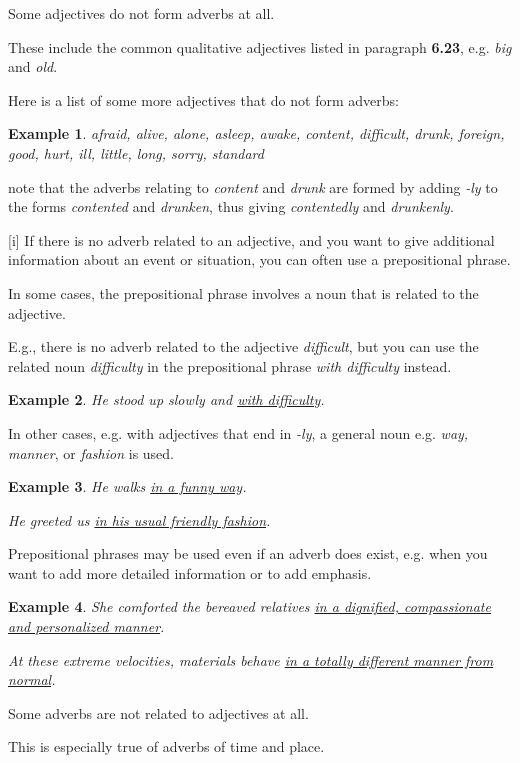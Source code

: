 \documentclass[oneside]{book}
\numberwithin{equation}{section}
\newtheorem{example}{Example}[section]
\begin{document}
%
\noindent{} Some adjectives do not form adverbs at all.

These include the common qualitative adjectives listed in paragraph \textbf{6.23}, e.g. \textit{big} and \textit{old}.

%
Here is a list of some more adjectives that do not form adverbs:
\begin{example}
    afraid, alive, alone, asleep, awake, content, difficult, drunk, foreign, good, hurt, ill, little, long, sorry, standard
\end{example}
note that the adverbs relating to \textit{content} and \textit{drunk} are formed by adding \textit{-ly} to the forms \textit{contented} and \textit{drunken}, thus giving \textit{contentedly} and \textit{drunkenly}.

%
\noindent{} [i] If there is no adverb related to an adjective, and you want to give additional information about an event or situation, you can often use a prepositional phrase.

%
In some cases, the prepositional phrase involves a noun that is related to the adjective.

E.g., there is no adverb related to the adjective \textit{difficult}, but you can use the related noun \textit{difficulty} in the prepositional phrase \textit{with difficulty} instead.
\begin{example}
    He stood up slowly and \underline{with difficulty}.
\end{example}
In other cases, e.g. with adjectives that end in \textit{-ly}, a general noun e.g. \textit{way, manner}, or \textit{fashion} is used.
\begin{example}
    He walks \underline{in a funny way}.
    
    He greeted us \underline{in his usual friendly fashion}.
\end{example}
Prepositional phrases may be used even if an adverb does exist, e.g. when you want to add more detailed information or to add emphasis.
\begin{example}
    She comforted the bereaved relatives \underline{in a dignified, compassionate and personalized manner}.
    
    At these extreme velocities, materials behave \underline{in a totally different manner from normal}.
\end{example}
%
\noindent{} Some adverbs are not related to adjectives at all.

This is especially true of adverbs of time and place.
\end{document}
